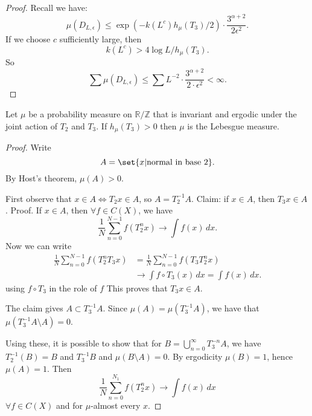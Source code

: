 \documentclass{article}
\begin{document}
\begin{proof}
  Recall we have:
  \begin{equation*}
    \mu(D_{L,\epsilon}) \leq \exp(-k(L^c) h_\mu(T_3)/2) \cdot \frac{3^{\alpha+2}}{2 \epsilon^2}.
  \end{equation*}
  If we choose $c$ sufficiently large, then
  \begin{equation*}
    k(L^c) > 4 \log L/h_\mu(T_3).
  \end{equation*}
  So
  \begin{equation*}
    \sum \mu(D_{L,\epsilon}) \leq \sum L^{-2} \cdot \frac{3^{\alpha+2}}{2 \cdot \epsilon^2} < \infty.
  \end{equation*}
\end{proof}
\begin{thm}
  Let $\mu$ be a probability measure on $\mathbb{R}/\mathbb{Z}$ that is invariant and ergodic under the joint action of $T_2$ and $T_3$.
  If $h_\mu(T_3) > 0$ then $\mu$ is the Lebesgue measure.
\end{thm}
\begin{proof}
  Write
  \begin{equation*}
    A = \set{x | \text{normal in base } 2}.
  \end{equation*}
  By Host's theorem, $\mu(A) > 0$.

  First observe that $x \in A \iff T_2 x \in A$, so $A = T_2^{-1} A$.
  Claim: if $x \in A$, then $T_3 x \in A$.
  Proof. If $x \in A$, then $\forall f \in C(X)$, we have
  \begin{equation*}
    \frac{1}{N} \sum_{n=0}^{N-1} f(T_2^n x) \to \int f(x) \, dx.
  \end{equation*}
  Now we can write
  \begin{align*}
    \frac{1}{N} \sum_{n=0}^{N-1} f(T_2^n T_3 x) &= \frac{1}{N} \sum_{n=0}^{N-1} f(T_3 T_2^n x) \\
                                                &\to \int f \circ T_3(x) \, dx = \int f(x) \, dx.
  \end{align*}
  using $f \circ T_3$ in the role of $f$
  This proves that $T_3 x \in A$.

  The claim gives $A \subset T_3^{-1} A$.
  Since $\mu(A) = \mu(T_3^{-1} A)$, we have that $\mu(T_3^{-1} A \setminus A) = 0$.

  Using these, it is possible to show that for $B = \bigcup_{n=0}^\infty T_3^{-n} A$, we have $T_2^{-1}(B) = B$ and $T_3^{-1} B$ and $\mu(B \setminus A) = 0$.
  By ergodicity $\mu(B) = 1$, hence $\mu(A) = 1$.
  Then
  \begin{equation*}
    \frac{1}{N} \sum_{n=0}^{N_1} f(T_2^n x) \to \int f(x) \, dx
  \end{equation*}
  $\forall f \in C(X)$ and for $\mu$-almost every $x$.
\end{proof}
\printindex
\end{document}
